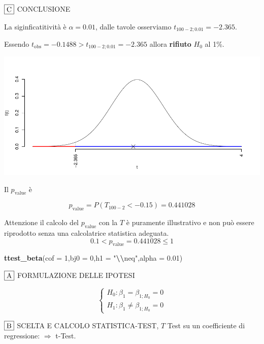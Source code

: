 \documentclass[
  11pt,
]{book}
\newenvironment{Shaded}{\begin{snugshade}}{\end{snugshade}}
\newcommand{\AttributeTok}[1]{\textcolor[rgb]{0.13,0.29,0.53}{#1}}
\newcommand{\DecValTok}[1]{\textcolor[rgb]{0.00,0.00,0.81}{#1}}
\newcommand{\FloatTok}[1]{\textcolor[rgb]{0.00,0.00,0.81}{#1}}
\newcommand{\FunctionTok}[1]{\textcolor[rgb]{0.13,0.29,0.53}{\textbf{#1}}}
\newcommand{\NormalTok}[1]{#1}
\newcommand{\SpecialCharTok}[1]{\textcolor[rgb]{0.81,0.36,0.00}{\textbf{#1}}}
\newcommand{\StringTok}[1]{\textcolor[rgb]{0.31,0.60,0.02}{#1}}
\theoremstyle{mytheoremstyle}
\theoremstyle{mydefstyle}
\begin{document}
\(\fbox{C}\) CONCLUSIONE

La siginficatitività è \(\alpha=0.01\), dalle tavole osserviamo \(t_{100-2;0.01}=-2.365\).

Essendo \(t_\text{obs}=-0.1488>t_{100-2;0.01}=-2.365\) allora \textbf{rifiuto} \(H_0\) al 1\%.

\begin{center}\includegraphics{Appunti_di_Statistica_2025_files/figure-latex/25-test-functions-11-1} \end{center}

Il \(p_{\text{value}}\) è

\[ p_{\text{value}} = P(T_{100-2}<-0.15)=0.441028 \]

Attenzione il calcolo del \(p_\text{value}\) con la \(T\) è puramente illustrativo e non può essere riprodotto senza una calcolatrice statistica adeguata.\[
 0.1 < p_\text{value}= 0.441028 \leq 1 
\]

\begin{Shaded}
\begin{Highlighting}[]
\FunctionTok{ttest\_beta}\NormalTok{(}\AttributeTok{cof =} \DecValTok{1}\NormalTok{,}\AttributeTok{bj0 =} \DecValTok{0}\NormalTok{,}\AttributeTok{h1 =} \StringTok{"}\SpecialCharTok{\textbackslash{}\textbackslash{}}\StringTok{neq"}\NormalTok{,}\AttributeTok{alpha =} \FloatTok{0.01}\NormalTok{)}
\end{Highlighting}
\end{Shaded}

\(\fbox{A}\) FORMULAZIONE DELLE IPOTESI

\[\begin{cases}
   H_0: \beta_1 = \beta_{1;H_0}=0 \\
   H_1: \beta_1 \neq \beta_{1;H_0}=0 
   \end{cases}\]

\(\fbox{B}\) SCELTA E CALCOLO STATISTICA-TEST, \(T\)
Test su un coefficiente di regressione: \(\Rightarrow\) t-Test.
\end{document}

